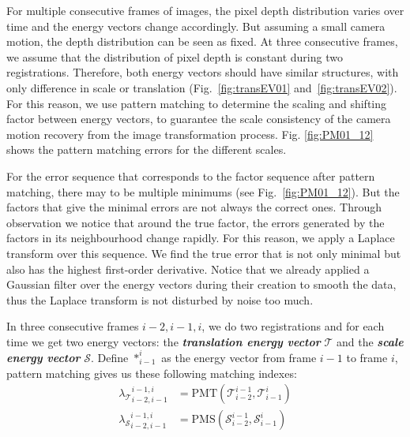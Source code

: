 \documentclass[letterpaper, 10 pt, conference]{ieeeconf}  %
\begin{document}
For multiple consecutive frames of images, the pixel depth distribution varies over time and the energy vectors change accordingly. But assuming a small camera motion, the depth distribution can be seen as fixed.
At three consecutive frames, we assume that the distribution of pixel depth is constant during two registrations. Therefore, both energy vectors should have similar structures, with only difference in scale or translation (Fig.~\ref{fig:transEV01} and~\ref{fig:transEV02}). For this reason, we use pattern matching to determine the scaling and shifting factor between energy vectors, to guarantee the scale consistency of the camera motion recovery from the image transformation process. Fig. \ref{fig:PM01_12} shows the pattern matching errors for the different scales.


For the error sequence that corresponds to the factor sequence after pattern matching, there may to be multiple minimums (see Fig.~\ref{fig:PM01_12}). But the factors that give the minimal errors are not always the correct ones. Through observation we notice that around the true factor, the errors generated by the factors in its neighbourhood change rapidly. For this reason, we apply a Laplace transform over this sequence. We find the true error that is not only minimal but also has the highest first-order derivative. Notice that we already applied a Gaussian filter over the energy vectors during their creation to smooth the data, thus the Laplace transform is not disturbed by noise too much. 

In three consecutive frames $i-2, i-1, i$, we do two registrations and for each time we get two energy vectors: the \textbf{\textit{translation energy vector}} $\mathcal{T}$ and the \textbf{\textit{scale energy vector}} $\mathcal{S}$. Define $*_{i-1}^{i}$ as the energy vector from frame $i-1$ to frame $i$, pattern matching gives us these following matching indexes:
\begin{equation}
    \begin{aligned}
        {\lambda_{\mathcal{T}}}_{i-2,i-1}^{i-1,i} &= \text{PMT}(\mathcal{T}_{i-2}^{i-1}, \mathcal{T}_{i-1}^{i})\\
        {\lambda_{\mathcal{S}}}_{i-2,i-1}^{i-1,i} &= \text{PMS}(\mathcal{S}_{i-2}^{i-1}, \mathcal{S}_{i-1}^{i})\\
    \end{aligned}
\end{equation}
\end{document}
